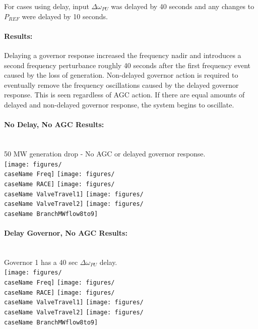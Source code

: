 \documentclass[12pt]{article}
\begin{document}
For cases using delay, input $\Delta \omega_{PU}$ was delayed by 40 seconds and any changes to $P_{REF}$ were delayed by 10 seconds.

\paragraph{Results:} 
Delaying a governor response increased the frequency nadir and introduces a second frequency perturbance roughly 40 seconds after the first frequency event caused by the loss of generation.
Non-delayed governor action is required to eventually remove the frequency oscillations caused by the delayed governor response.
This is seen regardless of AGC action.
If there are equal amounts of delayed and non-delayed governor response, the system begins to oscillate.

\newcommand{\scrunch}{-.8em}
\newcommand{\caseName}{casename}

\newcommand{\resultPres}{%
\texttt{[image: figures/\\caseName Freq]}
\vspace{\scrunch}
\texttt{[image: figures/\\caseName RACE]}
\vspace{\scrunch}
\texttt{[image: figures/\\caseName ValveTravel1]}
\vspace{\scrunch}
\texttt{[image: figures/\\caseName ValveTravel2]}
\vspace{\scrunch}
\texttt{[image: figures/\\caseName BranchMWflow8to9]}
}

\pagebreak
\renewcommand{\caseName}{SixMachineDelayStep2}
\paragraph{No Delay, No AGC Results: } \ \\
50 MW generation drop - No AGC or delayed governor response.
\\
\resultPres

\pagebreak
\renewcommand{\caseName}{SixMachineDelayStep4}
\paragraph{Delay Governor, No AGC Results: } \ \\
Governor 1 has a 40 sec $\Delta \omega_{PU}$ delay.
\\
\resultPres
\end{document}
